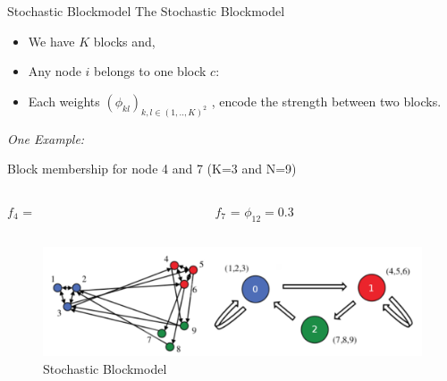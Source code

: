 \begin{frame}[t]{Stochastic Blockmodel}
    The Stochastic Blockmodel 

    \begin{itemize}
        \item We have $K$ blocks and,
        \item Any node $i$ belongs to one block $c$:
        \item Each weights $(\phi_{kl})_{k,l \in (1, .., K)^2}$ ,  encode the strength between two blocks.
    \end{itemize}

    \vspace{1em}
    \emph{One Example:}

    \begin{block}{Block membership for node 4 and 7 (K=3 and N=9)}

    \begin{columns}[t]
        \begin{column}{0.45\textwidth}
        $f_4$ = \raisebox{-2pt}{}
        \end{column}
        \begin{column}{0.45\textwidth}
            \hspace{-1.5cm}
        $f_7$ = \raisebox{-2pt}{}
            \hspace{0.5cm}
        $\phi_{12} = 0.3$
        \end{column}
    \end{columns}

    \end{block}

    \begin{figure}[h]
    \includegraphics[scale=0.3]{img/sb}
        \caption{Stochastic Blockmodel}
    \end{figure}
    
\end{frame}

